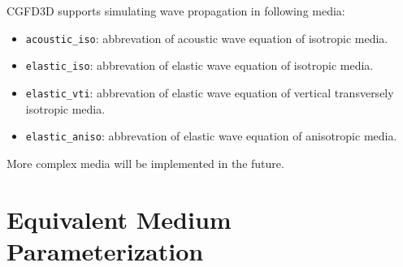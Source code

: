CGFD3D supports simulating wave propagation in following media:
\begin{itemize}
    \item \texttt{acoustic\_iso}: abbrevation of acoustic wave equation of isotropic media.  
    \item \texttt{elastic\_iso}: abbrevation of elastic wave equation of isotropic media.
    \item \texttt{elastic\_vti}: abbrevation of elastic wave equation of vertical transversely isotropic media. 
    \item \texttt{elastic\_aniso}: abbrevation of elastic wave equation of anisotropic media. 
\end{itemize}
More complex media will be implemented in the future.

\section{Equivalent Medium Parameterization} \label{equivalent_method} 

